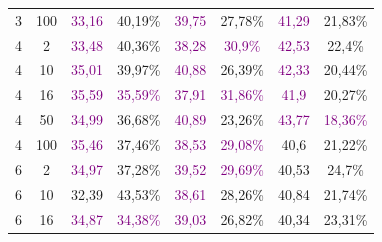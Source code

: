 \begin{table}[ht]
\begin{tabular}{cc|cc|cc|cc}
        {3}                           & {100}   & \textcolor{purple}{33,16}           & {40,19\%}                           & \textcolor{purple}{39,75}                & {27,78\%}                   & \textcolor{purple}{41,29} & {21,83\%}                   \\
        {4}                           & {2}     & \textcolor{purple}{33,48}           & {40,36\%}                           & \textcolor{purple}{38,28}                & \textcolor{purple}{30,9\%}  & \textcolor{purple}{42,53} & {22,4\%}                    \\
        {4}                           & {10}    & \textcolor{purple}{35,01}           & {39,97\%}                           & \textcolor{purple}{40,88}                & {26,39\%}                   & \textcolor{purple}{42,33} & {20,44\%}                   \\
        {4}                           & {16}    & \textcolor{purple}{35,59}           & \textcolor{purple}{35,59\%}         & \textcolor{purple}{37,91}                & \textcolor{purple}{31,86\%} & \textcolor{purple}{41,9}  & {20,27\%}                   \\
        {4}                           & {50}    & \textcolor{purple}{34,99}           & {36,68\%}                           & \textcolor{purple}{40,89}                & {23,26\%}                   & \textcolor{purple}{43,77} & \textcolor{purple}{18,36\%} \\
        {4}                           & {100}   & \textcolor{purple}{35,46}           & {37,46\%}                           & \textcolor{purple}{38,53}                & \textcolor{purple}{29,08\%} & {40,6}                    & {21,22\%}                   \\
        {6}                           & {2}     & \textcolor{purple}{34,97}           & {37,28\%}                           & \textcolor{purple}{39,52}                & \textcolor{purple}{29,69\%} & {40,53}                   & {24,7\%}                    \\
        {6}                           & {10}    & {32,39}                             & {43,53\%}                           & \textcolor{purple}{38,61}                & {28,26\%}                   & {40,84}                   & {21,74\%}                   \\
        {6}                           & {16}    & \textcolor{purple}{34,87}           & \textcolor{purple}{34,38\%}         & \textcolor{purple}{39,03}                & {26,82\%}                   & {40,34}                   & {23,31\%}                   \\

\end{tabular}
\end{table}
